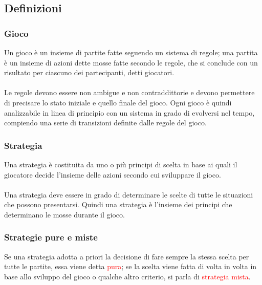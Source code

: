 \documentclass[12pt,a4paper]{article}
\begin{document}
\subsection{Definizioni}
\subsubsection{Gioco}
Un gioco è un insieme di partite fatte seguendo un sistema di regole; una partita è un insieme di azioni dette mosse fatte secondo le regole, che si conclude con un risultato per ciascuno dei
partecipanti, detti giocatori.\\
\\
Le regole devono essere non ambigue e non contraddittorie e devono permettere di precisare lo stato iniziale e quello finale del gioco. Ogni gioco è quindi analizzabile in linea di principio con un sistema in grado di evolversi nel tempo, compiendo una serie di transizioni definite dalle regole del gioco.

\subsubsection{Strategia}
Una strategia è costituita da uno o più principi di scelta in base ai quali il giocatore decide l’insieme delle azioni secondo cui sviluppare il gioco.\\
\\
Una strategia deve essere in grado di determinare le scelte di tutte le situazioni che possono presentarsi. Quindi una strategia è l’insieme dei principi che determinano le mosse durante il gioco.

\subsubsection{Strategie pure e miste}
Se una strategia adotta a priori la decisione di fare sempre la stessa scelta per tutte le partite, essa viene detta \textcolor{red}{pura}; se la scelta viene fatta di volta in volta in base allo sviluppo del gioco o qualche altro criterio, si parla di \textcolor{red}{strategia mista}.
\end{document}
